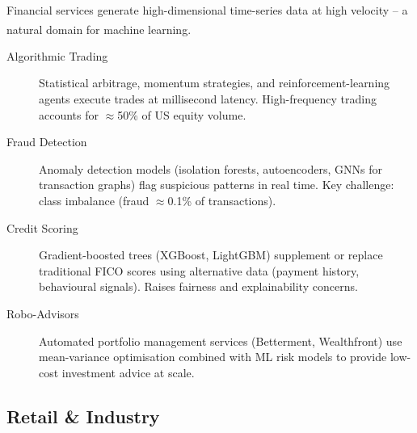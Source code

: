     \begin{tcbitemize}[ skin=sectionraster ]
        \tcbitem[title={AI in Financial Technology}, raster multicolumn=6]
        Financial services generate high-dimensional time-series data at high velocity -- a natural domain for machine learning.\textsuperscript{\cite{adjaouteAI2024}}

        \begin{description}
            \item[Algorithmic Trading] Statistical arbitrage, momentum strategies, and reinforcement-learning agents execute trades at millisecond latency. High-frequency trading accounts for $\approx$50\% of US equity volume.
            \item[Fraud Detection] Anomaly detection models (isolation forests, autoencoders, GNNs for transaction graphs) flag suspicious patterns in real time. Key challenge: class imbalance (fraud $\approx$0.1\% of transactions).
            \item[Credit Scoring] Gradient-boosted trees (XGBoost, LightGBM) supplement or replace traditional FICO scores using alternative data (payment history, behavioural signals). Raises fairness and explainability concerns.
            \item[Robo-Advisors] Automated portfolio management services (Betterment, Wealthfront) use mean-variance optimisation combined with ML risk models to provide low-cost investment advice at scale.
        \end{description}
    \end{tcbitemize}

    \subsection{Retail \& Industry}

